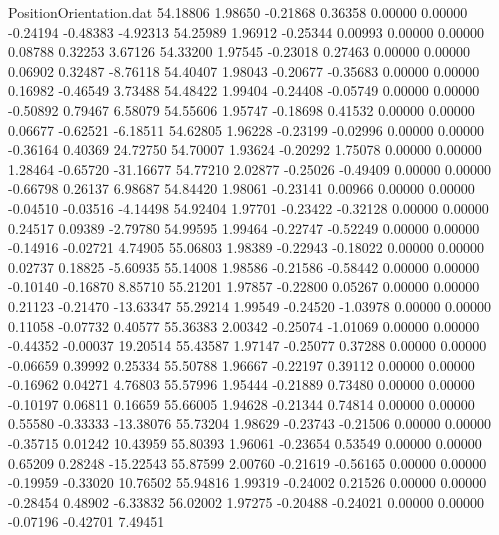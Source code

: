 \begin{filecontents}{PositionOrientation.dat}
  54.18806    1.98650   -0.21868     0.36358    0.00000    0.00000   -0.24194   -0.48383   -4.92313
  54.25989    1.96912   -0.25344     0.00993    0.00000    0.00000    0.08788    0.32253    3.67126
  54.33200    1.97545   -0.23018     0.27463    0.00000    0.00000    0.06902    0.32487   -8.76118
  54.40407    1.98043   -0.20677    -0.35683    0.00000    0.00000    0.16982   -0.46549    3.73488
  54.48422    1.99404   -0.24408    -0.05749    0.00000    0.00000   -0.50892    0.79467    6.58079
  54.55606    1.95747   -0.18698     0.41532    0.00000    0.00000    0.06677   -0.62521   -6.18511
  54.62805    1.96228   -0.23199    -0.02996    0.00000    0.00000   -0.36164    0.40369   24.72750
  54.70007    1.93624   -0.20292     1.75078    0.00000    0.00000    1.28464   -0.65720  -31.16677
  54.77210    2.02877   -0.25026    -0.49409    0.00000    0.00000   -0.66798    0.26137    6.98687
  54.84420    1.98061   -0.23141     0.00966    0.00000    0.00000   -0.04510   -0.03516   -4.14498
  54.92404    1.97701   -0.23422    -0.32128    0.00000    0.00000    0.24517    0.09389   -2.79780
  54.99595    1.99464   -0.22747    -0.52249    0.00000    0.00000   -0.14916   -0.02721    4.74905
  55.06803    1.98389   -0.22943    -0.18022    0.00000    0.00000    0.02737    0.18825   -5.60935
  55.14008    1.98586   -0.21586    -0.58442    0.00000    0.00000   -0.10140   -0.16870    8.85710
  55.21201    1.97857   -0.22800     0.05267    0.00000    0.00000    0.21123   -0.21470  -13.63347
  55.29214    1.99549   -0.24520    -1.03978    0.00000    0.00000    0.11058   -0.07732    0.40577
  55.36383    2.00342   -0.25074    -1.01069    0.00000    0.00000   -0.44352   -0.00037   19.20514
  55.43587    1.97147   -0.25077     0.37288    0.00000    0.00000   -0.06659    0.39992    0.25334
  55.50788    1.96667   -0.22197     0.39112    0.00000    0.00000   -0.16962    0.04271    4.76803
  55.57996    1.95444   -0.21889     0.73480    0.00000    0.00000   -0.10197    0.06811    0.16659
  55.66005    1.94628   -0.21344     0.74814    0.00000    0.00000    0.55580   -0.33333  -13.38076
  55.73204    1.98629   -0.23743    -0.21506    0.00000    0.00000   -0.35715    0.01242   10.43959
  55.80393    1.96061   -0.23654     0.53549    0.00000    0.00000    0.65209    0.28248  -15.22543
  55.87599    2.00760   -0.21619    -0.56165    0.00000    0.00000   -0.19959   -0.33020   10.76502
  55.94816    1.99319   -0.24002     0.21526    0.00000    0.00000   -0.28454    0.48902   -6.33832
  56.02002    1.97275   -0.20488    -0.24021    0.00000    0.00000   -0.07196   -0.42701    7.49451

\end{filecontents}
